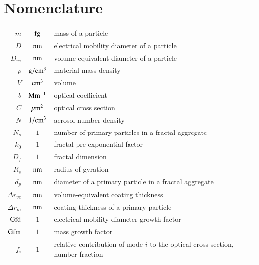 \documentclass[12pt,authoryear]{elsarticle}
\begin{document}
\section*{Nomenclature}
\begin{tabular}{r c l}
    $m$ & $\rm fg$ & mass of a particle\\
    $D$ & $\rm nm$ & electrical mobility diameter of a particle\\
    $D_{ve}$ & $\rm nm$ & volume-equivalent diameter of a particle\\
    $\rho$ & $\rm g/cm^3$ & material mass density\\
    $V$ & $\rm cm^3$ & volume\\
    $b$ & $\rm Mm^{-1}$ & optical coefficient\\
    $C$ & $\rm \mu m^2$ & optical cross section\\
    $N$ & $\rm 1/cm^3$ & aerosol number density\\
    $N_s$ & $1$ & number of primary particles in a fractal aggregate\\
    $k_0$ & $1$ & fractal pre-exponential factor\\
    $D_f$ & $1$ & fractal dimension\\
    $R_s$ & $\rm nm$ & radius of gyration\\
    $d_p$ & $\rm nm$ & diameter of a primary particle in a fractal aggregate\\
    $\Delta r_{ve}$ & $\rm nm$ & volume-equivalent coating thickness\\
    $\Delta r_m$ & $\rm nm$& coating thickness of a primary particle\\
    $\rm Gfd$ & $1$ & electrical mobility diameter growth factor\\
    $\rm Gfm$ & $1$ & mass growth factor\\
    $f_i$ & $1$ & relative contribution of mode $i$ to the optical cross section, number fraction\\
\end{tabular}
\end{document}
